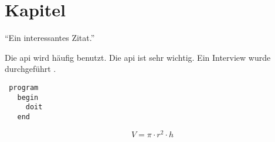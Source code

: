 \section{Kapitel}

\enquote{Ein interessantes Zitat.} \cite[1]{test}

Die \gls{api} wird häufig benutzt. Die \gls{api} ist sehr wichtig. Ein Interview wurde durchgeführt .

\begin{verbatim}
 program
   begin
     doit
   end
\end{verbatim}

\begin{equation}
V= \pi \cdot r^{2} \cdot h
\end{equation}

\lipsum